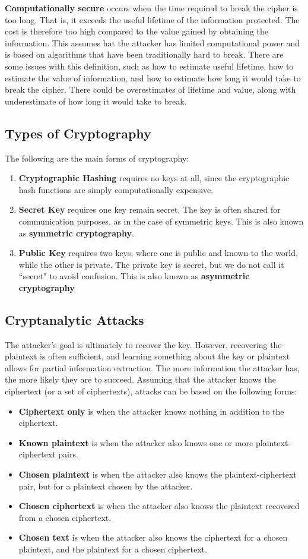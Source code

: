 \documentclass[11pt]{article}
\theoremstyle{plain} %
\theoremstyle{definition}
\theoremstyle{example}
\theoremstyle{remark}
\begin{document}
\textbf{Computationally secure} occurs when the time required to break the cipher is too long. That is, it exceeds the useful lifetime of the information protected. The cost is therefore too high compared to the value gained by obtaining the information. This assumes hat the attacker has limited computational power and is based on algorithms that have been traditionally hard to break. There are some issues with this definition, such as how to estimate useful lifetime, how to estimate the value of information, and how to estimate how long it would take to break the cipher. There could be overestimates of lifetime and value, along with underestimate of how long it would take to break. 

\subsection{Types of Cryptography}
The following are the main forms of cryptography:
\begin{enumerate}
	\item \textbf{Cryptographic Hashing} requires no keys at all, since the cryptographic hash functions are simply computationally expensive.
	\item \textbf{Secret Key} requires one key remain secret. The key is often shared for communication purposes, as in the case of symmetric keys. This is also known as \textbf{symmetric cryptography}. 
	\item \textbf{Public Key} requires two keys, where one is public and known to the world, while the other is private. The private key is secret, but we do not call it ``secret" to avoid confusion. This is also known as \textbf{asymmetric cryptography}
\end{enumerate}

\subsection{Cryptanalytic Attacks}
The attacker's goal is ultimately to recover the key. However, recovering the plaintext is often sufficient, and learning something about the key or plaintext allows for partial information extraction. The more information the attacker has, the more likely they are to succeed. Assuming that the attacker knows the ciphertext (or a set of ciphertexts), attacks can be based on the following forms:
\begin{itemize}
	\item \textbf{Ciphertext only} is when the attacker knows nothing in addition to the ciphertext.
	\item \textbf{Known plaintext} is when the attacker also knows one or more plaintext-ciphertext pairs. 
	\item \textbf{Chosen plaintext} is when the attacker also knows the plaintext-ciphertext pair, but for a plaintext chosen by the attacker.
	\item \textbf{Chosen ciphertext} is when the attacker also knows the plaintext recovered from a chosen ciphertext.
	\item \textbf{Chosen text} is when the attacker also knows the ciphertext for a chosen plaintext, and the plaintext for a chosen ciphertext. 
\end{itemize}
\end{document}
